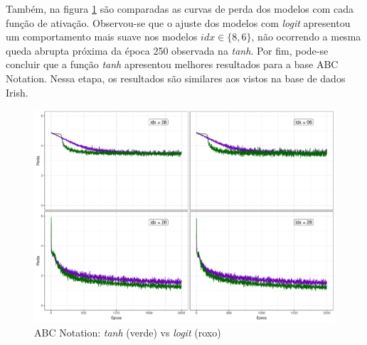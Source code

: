 \documentclass{automatextcc}
\begin{document}
Também, na figura \ref{fig:abcnotation_tanh_vs_logit} são comparadas as curvas de perda dos modelos com cada função de ativação. Observou-se que o ajuste dos modelos com \textit{logit} apresentou um comportamento mais suave nos modelos $idx \in \{8,6\}$, não ocorrendo a mesma queda abrupta próxima da época 250 observada na \textit{tanh}. Por fim, pode-se concluir que a função \textit{tanh} apresentou melhores resultados para a base ABC Notation. Nessa etapa, os resultados são similares aos vistos na base de dados Irish. 

\begin{figure}
    \centering
    \includegraphics[width=\textwidth]{abcnotation_tanh_vs_logit.pdf}
    \caption{ABC Notation: \textit{tanh} (verde) vs \textit{logit} (roxo)}
    \label{fig:abcnotation_tanh_vs_logit}
\end{figure}



\end{document}
